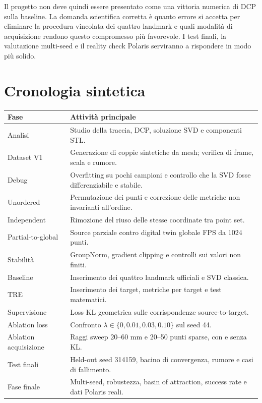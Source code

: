 \documentclass[11pt,a4paper]{article}
\begin{document}
Il progetto non deve quindi essere presentato come una vittoria numerica di
DCP sulla baseline. La domanda scientifica corretta è quanto errore si accetta
per eliminare la procedura vincolata dei quattro landmark e quali modalità di
acquisizione rendono questo compromesso più favorevole. I test finali,
la valutazione multi-seed e il reality check Polaris serviranno a rispondere in
modo più solido.

\appendix

\section{Cronologia sintetica}

\begin{longtable}{p{}p{}}
\toprule
Fase & Attività principale \\
\midrule
\endhead
Analisi & Studio della traccia, DCP, soluzione SVD e componenti STL. \\
Dataset V1 & Generazione di coppie sintetiche da mesh; verifica di frame,
scala e rumore. \\
Debug & Overfitting su pochi campioni e controllo che la SVD fosse
differenziabile e stabile. \\
Unordered & Permutazione dei punti e correzione delle metriche non invarianti
all'ordine. \\
Independent & Rimozione del riuso delle stesse coordinate tra point set. \\
Partial-to-global & Source parziale contro digital twin globale FPS da 1024
punti. \\
Stabilità & GroupNorm, gradient clipping e controlli sui valori non finiti. \\
Baseline & Inserimento dei quattro landmark ufficiali e SVD classica. \\
TRE & Inserimento dei target, metriche per target e test matematici. \\
Supervisione & Loss KL geometrica sulle corrispondenze source-to-target. \\
Ablation loss & Confronto $\lambda\in\{0,0.01,0.03,0.10\}$ sul seed 44. \\
Ablation acquisizione & Raggi sweep 20--60 mm e 20--50 punti sparse, con e senza KL. \\
Test finali & Held-out seed 314159, bacino di convergenza, rumore e casi di fallimento. \\
Fase finale & Multi-seed, robustezza, basin of attraction, success rate e dati
Polaris reali. \\
\bottomrule
\end{longtable}
\end{document}
